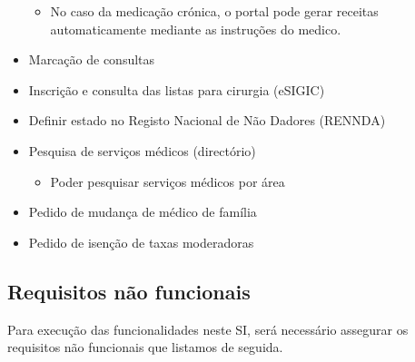 \documentclass[12pt, a4paper, twoside]{report} %
\begin{document}
\begin{itemize}
\begin{itemize}
	\item No caso da medicação crónica, o portal pode gerar receitas automaticamente mediante as instruções do medico.
	\end{itemize}
\item Marcação de consultas
\item Inscrição e consulta das listas para cirurgia (eSIGIC)
\item Definir estado no Registo Nacional de Não Dadores (RENNDA)
\item Pesquisa de serviços médicos (directório)
	\begin{itemize}
	\item Poder pesquisar serviços médicos por área
	\end{itemize}
\item Pedido de mudança de médico de família
\item Pedido de isenção de taxas moderadoras

\end{itemize}


\subsection{Requisitos não funcionais}

Para execução das funcionalidades neste SI, será necessário assegurar os requisitos não funcionais que listamos de seguida.
\end{document}
